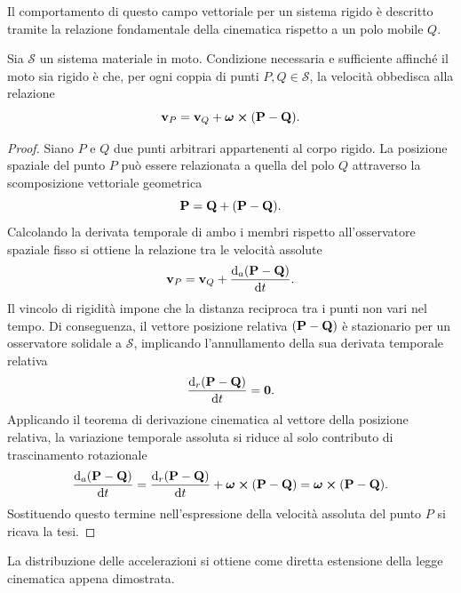 Il comportamento di questo campo vettoriale per un sistema rigido è descritto tramite la relazione fondamentale della cinematica rispetto a un polo mobile $Q$.

\begin{theorem}
    Sia $\mathcal{S}$ un sistema materiale in moto. Condizione necessaria e sufficiente affinché il moto sia rigido è che, per ogni coppia di punti $P, Q \in \mathcal{S}$, la velocità obbedisca alla relazione
    \begin{equation}
        \label{eq:legge_cinematica}
        \vb{v}_P = \vb{v}_Q + \vb*{\omega} \cross (\vb{P} - \vb{Q}).
    \end{equation}
\end{theorem}

\begin{proof}
    Siano $P$ e $Q$ due punti arbitrari appartenenti al corpo rigido. La posizione spaziale del punto $P$ può essere relazionata a quella del polo $Q$ attraverso la scomposizione vettoriale geometrica
    \begin{equation*}
        \vb{P} = \vb{Q} + (\vb{P} - \vb{Q}).
    \end{equation*}
    Calcolando la derivata temporale di ambo i membri rispetto all'osservatore spaziale fisso si ottiene la relazione tra le velocità assolute
    \begin{equation*}
        \vv_P = \vv_Q + \dva{(\vP - \vQ)}{t}.
    \end{equation*}
    Il vincolo di rigidità impone che la distanza reciproca tra i punti non vari nel tempo. Di conseguenza, il vettore posizione relativa $(\vb{P} - \vb{Q})$ è stazionario per un osservatore solidale a $\mathcal{S}$, implicando l'annullamento della sua derivata temporale relativa
    \begin{equation*}
        \dvr{(\vP - \vQ)}{t} = \vb{0}.
    \end{equation*}
    Applicando il teorema di derivazione cinematica al vettore della posizione relativa, la variazione temporale assoluta si riduce al solo contributo di trascinamento rotazionale
    \begin{equation*}
        \dva{(\vP - \vQ)}{t} = \dvr{(\vP - \vQ)}{t} + \vb*{\omega} \cross (\vP - \vQ) = \vb*{\omega} \cross (\vP - \vQ).
    \end{equation*}
    Sostituendo questo termine nell'espressione della velocità assoluta del punto $P$ si ricava la tesi.
\end{proof}

La distribuzione delle accelerazioni si ottiene come diretta estensione della legge cinematica appena dimostrata.

